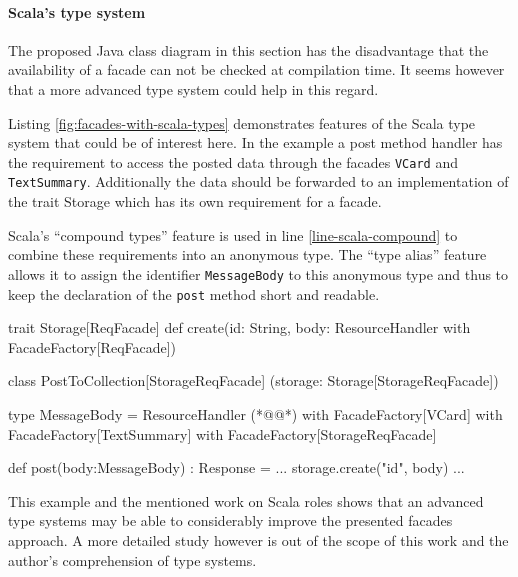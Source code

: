 \documentclass[11pt,a4paper,headsepline,twoside]{scrartcl}		%
\begin{document}
\paragraph{Scala's type system}


The proposed Java class diagram in this section has the disadvantage that the
availability of a facade can not be checked at compilation time. It seems
however that a more advanced type system could help in this regard.

Listing \ref{fig:facades-with-scala-types} demonstrates features of the Scala
type system \cite{Odersky2011} that could be of interest here. In the example a
post method handler has the requirement to access the posted data through the
facades \lstinline:VCard: and \lstinline:TextSummary:. Additionally the data
should be forwarded to an implementation of the trait Storage which has its own
requirement for a facade.

Scala's ``compound types'' feature is used in line \ref{line-scala-compound} to
combine these requirements into an anonymous type. The ``type alias'' feature
allows it to assign the identifier \lstinline:MessageBody: to this anonymous
type and thus to keep the declaration of the \lstinline:post: method short and
readable.

\begin{javalisting}[label=fig:facades-with-scala-types,
                   numbers=left,
                   escapeinside={(*@}{@*)},
                   caption={Implementing the facades approach with Scala's type system}]
trait Storage[ReqFacade] {
 def create(id: String,
            body: ResourceHandler
                  with FacadeFactory[ReqFacade])
}

class PostToCollection[StorageReqFacade]
            (storage: Storage[StorageReqFacade]) {
 type MessageBody = ResourceHandler (*@\label{line-scala-compound}@*)
                    with FacadeFactory[VCard] 
                    with FacadeFactory[TextSummary]
                    with FacadeFactory[StorageReqFacade]
  
 def post(body:MessageBody) : Response = {
  ...
  storage.create("id", body)
  ...
 }
}
\end{javalisting}

This example and the mentioned work on Scala roles shows that an advanced type
systems may be able to considerably improve the presented facades approach. A
more detailed study however is out of the scope of this work and the author's
comprehension of type systems. %
\end{document}

